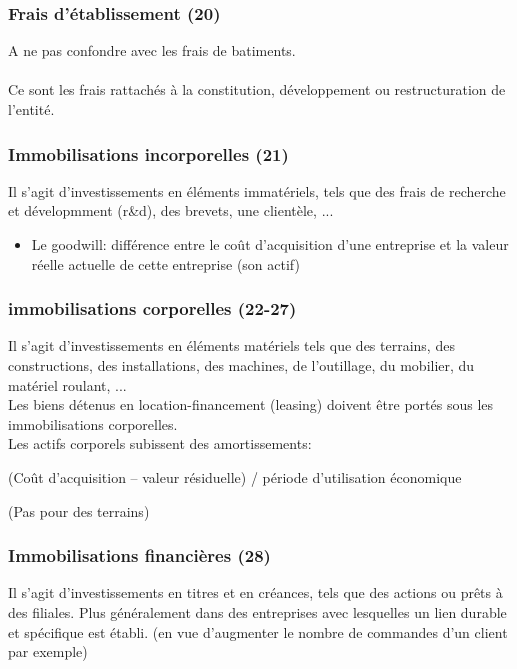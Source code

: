 \documentclass{article}
\begin{document}
\subsubsection*{Frais d'établissement (20)}
A ne pas confondre avec les frais de batiments. \\ \\
Ce sont les frais rattachés à la constitution, développement ou restructuration de l'entité. 

\subsubsection*{Immobilisations incorporelles (21)}
Il s'agit d'investissements en éléments immatériels, tels que des frais de recherche et dévelopmment (r\&d), des brevets, une clientèle, ... \\
\begin{itemize}
    \item Le goodwill: différence entre le coût d'acquisition d'une entreprise et la valeur réelle actuelle de cette entreprise (son actif)
\end{itemize}

\subsubsection*{immobilisations corporelles (22-27)}
Il s'agit d'investissements en éléments matériels tels que des terrains, des constructions, des installations, des machines, de l'outillage, du mobilier, du matériel roulant, ...\\ 
Les biens détenus en location-financement (leasing) doivent être portés sous les immobilisations corporelles.\\
Les actifs corporels subissent des amortissements: \\
\begin{center}
(Coût d’acquisition – valeur résiduelle) / période d’utilisation économique \\
\end{center}
(Pas pour des terrains) \\

\subsubsection*{Immobilisations financières (28)}
Il s'agit d'investissements en titres et en créances, tels que des actions ou prêts à des filiales. Plus généralement dans des entreprises avec lesquelles un lien durable et spécifique est établi. (en vue d'augmenter le nombre de commandes d'un client par exemple)
\end{document}
